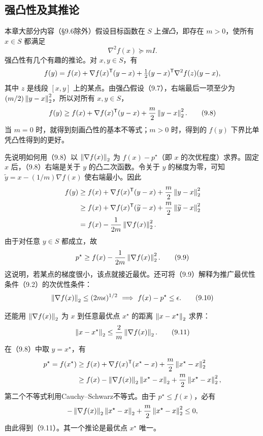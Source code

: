 \subsection{强凸性及其推论}
本章大部分内容（§9.6除外）假设目标函数在 $S$ 上\emph{强凸}，即存在 $m>0$，使所有 $x\in S$ 都满足
\begin{equation}
\nabla^2 f(x)\succeq mI.\tag{9.7}
\end{equation}
强凸性有几个有趣的推论。对 $x,y\in S$，有
\[
f(y)=f(x)+\nabla f(x)^\mathsf T(y-x)
+\tfrac12(y-x)^\mathsf T\nabla^2f(z)(y-x),
\]
其中 $z$ 是线段 $[x,y]$ 上的某点。由强凸假设（9.7），右端最后一项至少为 $(m/2)\left\lVert y-x\right\rVert_2^2$，所以对所有 $x,y\in S$，
\begin{equation}
f(y)\ge f(x)+\nabla f(x)^\mathsf T(y-x)+\frac m2\left\lVert y-x\right\rVert_2^2.\tag{9.8}
\end{equation}
当 $m=0$ 时，就得到刻画凸性的基本不等式；$m>0$ 时，得到的 $f(y)$ 下界比单凭凸性得到的更好。

先说明如何用（9.8）以 $\left\lVert \nabla f(x)\right\rVert_2$ 为 $f(x)-p^\star$（即 $x$ 的次优程度）求界。固定 $x$ 后，（9.8）右端是关于 $y$ 的凸二次函数。令关于 $y$ 的梯度为零，可知 $\widetilde y=x-(1/m)\nabla f(x)$ 使右端最小。因此
\[
\begin{aligned}
f(y)&\ge f(x)+\nabla f(x)^\mathsf T(y-x)+\frac m2\left\lVert y-x\right\rVert_2^2\\
&\ge f(x)+\nabla f(x)^\mathsf T(\widetilde y-x)+\frac m2\left\lVert \widetilde y-x\right\rVert_2^2\\
&=f(x)-\frac1{2m}\left\lVert \nabla f(x)\right\rVert_2^2.
\end{aligned}
\]
由于对任意 $y\in S$ 都成立，故
\begin{equation}
p^\star\ge f(x)-\frac1{2m}\left\lVert \nabla f(x)\right\rVert_2^2.\tag{9.9}
\end{equation}
这说明，若某点的梯度很小，该点就接近最优。还可将（9.9）解释为推广最优性条件（9.2）的次优性条件：
\begin{equation}
\left\lVert \nabla f(x)\right\rVert_2\le(2m\epsilon)^{1/2}
\ \Longrightarrow\ f(x)-p^\star\le\epsilon.\tag{9.10}
\end{equation}

还能用 $\left\lVert \nabla f(x)\right\rVert_2$ 为 $x$ 到任意最优点 $x^\star$ 的距离 $\left\lVert x-x^\star\right\rVert_2$ 求界：
\begin{equation}
\left\lVert x-x^\star\right\rVert_2\le\frac2m\left\lVert \nabla f(x)\right\rVert_2.\tag{9.11}
\end{equation}
在（9.8）中取 $y=x^\star$，有
\[
\begin{aligned}
p^\star=f(x^\star)
&\ge f(x)+\nabla f(x)^\mathsf T(x^\star-x)+\frac m2\left\lVert x^\star-x\right\rVert_2^2\\
&\ge f(x)-\left\lVert \nabla f(x)\right\rVert_2\left\lVert x^\star-x\right\rVert_2+\frac m2\left\lVert x^\star-x\right\rVert_2^2,
\end{aligned}
\]
第二个不等式利用Cauchy--Schwarz不等式。由于 $p^\star\le f(x)$，必有
\[
-\left\lVert \nabla f(x)\right\rVert_2\left\lVert x^\star-x\right\rVert_2+\frac m2\left\lVert x^\star-x\right\rVert_2^2\le0,
\]
由此得到（9.11）。其一个推论是最优点 $x^\star$ 唯一。


